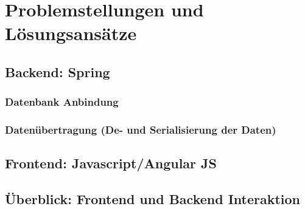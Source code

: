 \section{Problemstellungen und Lösungsansätze}

\subsection{Backend: Spring}

\subsubsection{Datenbank Anbindung}

\subsubsection{Datenübertragung (De- und Serialisierung der Daten)}

\subsection{Frontend: Javascript/Angular JS}

\subsection{Überblick: Frontend und Backend Interaktion}